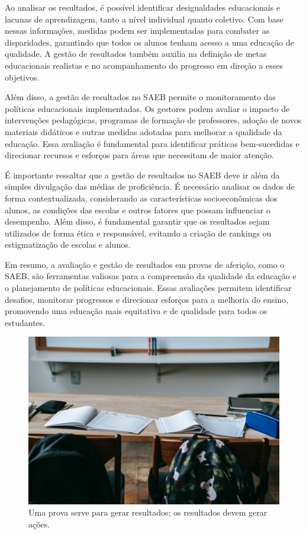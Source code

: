 Ao analisar os resultados, é possível identificar desigualdades
educacionais e lacunas de aprendizagem, tanto a nível individual quanto
coletivo. Com base nessas informações, medidas podem ser implementadas
para combater as disparidades, garantindo que todos os alunos tenham
acesso a uma educação de qualidade. A gestão de resultados também
auxilia na definição de metas educacionais realistas e no acompanhamento
do progresso em direção a esses objetivos.

Além disso, a gestão de resultados no SAEB permite o monitoramento das
políticas educacionais implementadas. Os gestores podem avaliar o
impacto de intervenções pedagógicas, programas de formação de
professores, adoção de novos materiais didáticos e outras medidas
adotadas para melhorar a qualidade da educação. Essa avaliação é
fundamental para identificar práticas bem-sucedidas e direcionar
recursos e esforços para áreas que necessitam de maior atenção.

É importante ressaltar que a gestão de resultados no SAEB deve ir além
da simples divulgação das médias de proficiência. É necessário analisar
os dados de forma contextualizada, considerando as características
socioeconômicas dos alunos, as condições das escolas e outros fatores
que possam influenciar o desempenho. Além disso, é fundamental garantir
que os resultados sejam utilizados de forma ética e responsável,
evitando a criação de rankings ou estigmatização de escolas e alunos.

Em resumo, a avaliação e gestão de resultados em provas de aferição,
como o SAEB, são ferramentas valiosas para a compreensão da qualidade da
educação e o planejamento de políticas educacionais. Essas avaliações
permitem identificar desafios, monitorar progressos e direcionar
esforços para a melhoria do ensino, promovendo uma educação mais
equitativa e de qualidade para todos os estudantes.

\begin{figure}
\centering
\includegraphics[width=\textwidth]{./imgs/Imagem005.jpg}
\caption{Uma prova serve para gerar resultados; os resultados devem
gerar ações.}
\end{figure}

